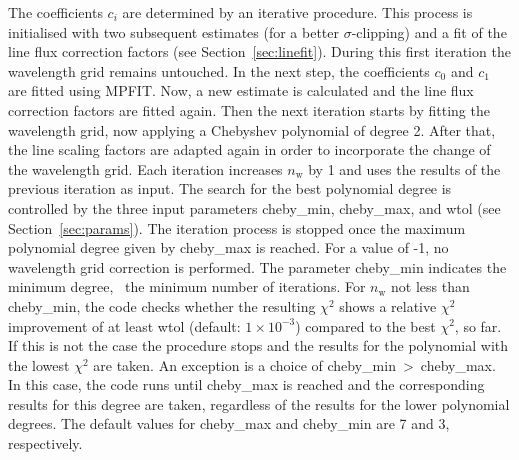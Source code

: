 The coefficients $c_i$ are determined by an iterative procedure. This process
is initialised with two subsequent estimates (for a better $\sigma$-clipping)
and a fit of the line flux correction factors (see Section~\ref{sec:linefit}).
During this first iteration the wavelength grid remains untouched. In the next
step, the coefficients $c_0$ and $c_1$ are fitted using MPFIT. Now, a new
estimate is calculated and the line flux correction factors are fitted again.
Then the next iteration starts by fitting the wavelength grid, now applying a
Chebyshev polynomial of degree 2. After that, the line scaling factors are
adapted again in order to incorporate the change of the wavelength grid. Each
iteration increases $n_\mathrm{w}$ by 1 and uses the results of the
previous iteration as input. The search for the best polynomial degree is
controlled by the three input parameters {\sc cheby\_min}, {\sc cheby\_max},
and {\sc wtol} (see Section~\ref{sec:params}). The iteration process is stopped
once the maximum polynomial degree given by {\sc cheby\_max} is reached. For a
value of -1, no wavelength grid correction is performed. The parameter
{\sc cheby\_min} indicates the minimum degree, \ie\ the minimum number of
iterations. For $n_\mathrm{w}$ not less than {\sc cheby\_min}, the code checks
whether the resulting $\chi^2$ shows a relative $\chi^2$ improvement of at
least {\sc wtol} (default: $1 \times 10^{-3}$) compared to the best $\chi^2$, so
far. If this is not the case the procedure stops and the results for the
polynomial with the lowest $\chi^2$ are taken. An exception is a choice of
{\sc cheby\_min}~>~{\sc cheby\_max}. In this case, the code runs until
{\sc cheby\_max} is reached and the corresponding results for this degree are
taken, regardless of the results for the lower polynomial degrees. The default
values for {\sc cheby\_max} and {\sc cheby\_min} are 7 and 3, respectively.

